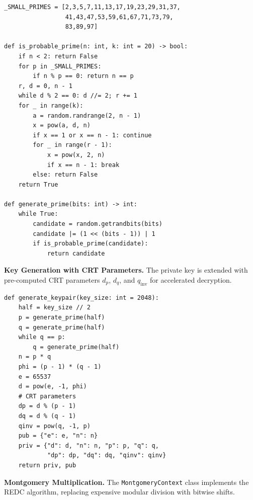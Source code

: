 \documentclass[journal]{IEEEtran}
\begin{document}
\begin{lstlisting}
_SMALL_PRIMES = [2,3,5,7,11,13,17,19,23,29,31,37,
                 41,43,47,53,59,61,67,71,73,79,
                 83,89,97]

def is_probable_prime(n: int, k: int = 20) -> bool:
    if n < 2: return False
    for p in _SMALL_PRIMES:
        if n % p == 0: return n == p
    r, d = 0, n - 1
    while d % 2 == 0: d //= 2; r += 1
    for _ in range(k):
        a = random.randrange(2, n - 1)
        x = pow(a, d, n)
        if x == 1 or x == n - 1: continue
        for _ in range(r - 1):
            x = pow(x, 2, n)
            if x == n - 1: break
        else: return False
    return True

def generate_prime(bits: int) -> int:
    while True:
        candidate = random.getrandbits(bits)
        candidate |= (1 << (bits - 1)) | 1
        if is_probable_prime(candidate):
            return candidate
\end{lstlisting}
\vspace{-2mm}
\label{lst:prime}

\textbf{Key Generation with CRT Parameters.}
The private key is extended with pre-computed CRT parameters $d_p$, $d_q$, and $q_{\mathrm{inv}}$ for accelerated decryption.

\begin{lstlisting}
def generate_keypair(key_size: int = 2048):
    half = key_size // 2
    p = generate_prime(half)
    q = generate_prime(half)
    while q == p:
        q = generate_prime(half)
    n = p * q
    phi = (p - 1) * (q - 1)
    e = 65537
    d = pow(e, -1, phi)
    # CRT parameters
    dp = d % (p - 1)
    dq = d % (q - 1)
    qinv = pow(q, -1, p)
    pub = {"e": e, "n": n}
    priv = {"d": d, "n": n, "p": p, "q": q,
            "dp": dp, "dq": dq, "qinv": qinv}
    return priv, pub
\end{lstlisting}
\vspace{-2mm}
\label{lst:keygen}

\textbf{Montgomery Multiplication.}
The \texttt{MontgomeryContext} class implements the REDC algorithm, replacing expensive modular division with bitwise shifts.
\end{document}
